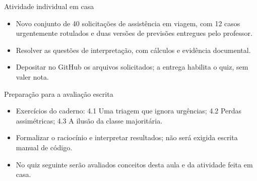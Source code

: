 \documentclass[10pt,aspectratio=169]{beamer}
\begin{document}
\begin{frame}[t]{Atividade individual em casa}
\small
\begin{itemize}
\item Novo conjunto de 40 solicitações de assistência em viagem, com 12 casos urgentemente rotulados e duas versões de previsões entregues pelo professor.
\item Resolver as questões de interpretação, com cálculos e evidência documental.
\item Depositar no GitHub os arquivos solicitados; a entrega habilita o quiz, sem valer nota.
\end{itemize}
\end{frame}

\begin{frame}[t]{Preparação para a avaliação escrita}
\small
\begin{itemize}
\item Exercícios do caderno: 4.1 Uma triagem que ignora urgências; 4.2 Perdas assimétricas; 4.3 A ilusão da classe majoritária.
\item Formalizar o raciocínio e interpretar resultados; não será exigida escrita manual de código.
\item No quiz seguinte serão avaliados conceitos desta aula e da atividade feita em casa.
\end{itemize}
\end{frame}
\end{document}
